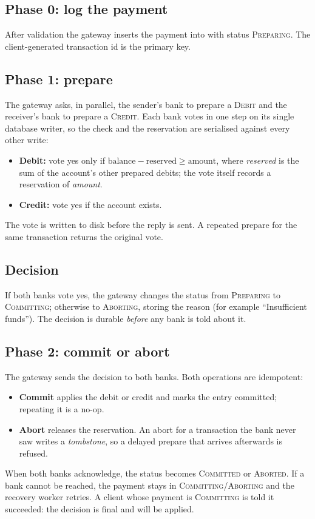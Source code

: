 \documentclass[11pt]{article}
\newcommand{\code}[1]{\texttt{\detokenize{#1}}}
\newcommand{\st}[1]{\textsc{#1}}
\begin{document}
\subsection{Phase 0: log the payment}
After validation the gateway inserts the payment into \code{gateway.db} with
status \st{Preparing}. The client-generated transaction id is the primary key.

\subsection{Phase 1: prepare}
The gateway asks, in parallel, the sender's bank to prepare a \st{Debit} and
the receiver's bank to prepare a \st{Credit}. Each bank votes in one step on
its single database writer, so the check and the reservation are serialised
against every other write:
\begin{itemize}
  \item \textbf{Debit:} vote yes only if
        $\text{balance} - \text{reserved} \ge \text{amount}$, where
        \emph{reserved} is the sum of the account's other prepared debits; the
        vote itself records a reservation of \emph{amount}.
  \item \textbf{Credit:} vote yes if the account exists.
\end{itemize}
The vote is written to disk before the reply is sent. A repeated prepare for
the same transaction returns the original vote.

\subsection{Decision}
If both banks vote yes, the gateway changes the status from \st{Preparing} to
\st{Committing}; otherwise to \st{Aborting}, storing the reason (for example
``Insufficient funds''). The decision is durable \emph{before} any bank is told
about it.

\subsection{Phase 2: commit or abort}
The gateway sends the decision to both banks. Both operations are idempotent:
\begin{itemize}
  \item \textbf{Commit} applies the debit or credit and marks the entry
        committed; repeating it is a no-op.
  \item \textbf{Abort} releases the reservation. An abort for a transaction the
        bank never saw writes a \emph{tombstone}, so a delayed prepare that
        arrives afterwards is refused.
\end{itemize}
When both banks acknowledge, the status becomes \st{Committed} or
\st{Aborted}. If a bank cannot be reached, the payment stays in
\st{Committing}/\st{Aborting} and the recovery worker retries. A client whose
payment is \st{Committing} is told it succeeded: the decision is final and will
be applied.
\end{document}
